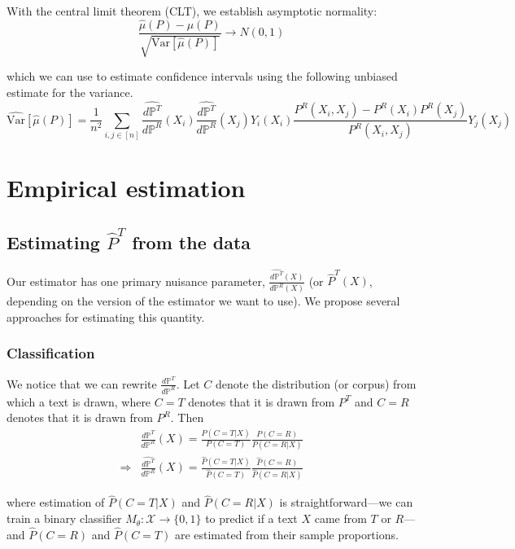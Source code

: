 \documentclass{article}
\begin{document}
With the central limit theorem (CLT), we establish asymptotic normality:
\begin{equation*}
    \frac{\hat{\mu}(P) - \mu(P)}{\sqrt{\text{Var}[\hat{\mu}(P)]}}\rightarrow N(0,1)
\end{equation*}

which we can use to estimate confidence intervals using the following unbiased estimate for the variance.
\begin{equation*}
    \widehat{\text{Var}}[\hat{\mu}(P)] = \frac{1}{n^2} \sum_{i,j \in [n]} \frac{\hat{d \mathbb{P}^T}}{d \mathbb{P}^R}(X_i)\frac{\hat{d \mathbb{P}^T}}{d \mathbb{P}^R}(X_j)Y_i(X_i)\frac{P^R(X_i,X_j) - P^R(X_i)P^R(X_j)}{P^R(X_i,X_j)}Y_j(X_j)
\end{equation*}

\section{Empirical estimation}
\subsection{Estimating $\hat{P}^T$ from the data}

Our estimator has one primary nuisance parameter, $\frac{\hat{d\mathbb{P}^T}(X)}{d\mathbb{P}^R(X)}$ (or $\hat{P}^T(X)$, depending on the version of the estimator we want to use). We propose several approaches for estimating this quantity.

\subsubsection{Classification}
\label{sec:classification}

We notice that we can rewrite $\frac{d\mathbb{P}^T}{d\mathbb{P}^R}$. Let $C$ denote the distribution (or corpus) from which a text is drawn, where $C=T$ denotes that it is drawn from $P^T$ and $C=R$ denotes that it is drawn from $P^R$. Then
\begin{equation*}
    \begin{split}
        &\frac{d\mathbb{P}^T}{d\mathbb{P}^R}(X) = \frac{P(C=T|X)}{P(C=T)}\frac{P(C=R)}{P(C=R|X)}\\
        \Rightarrow &\frac{\hat{d\mathbb{P}^T}}{d\mathbb{P}^R}(X) = \frac{\hat{P}(C=T|X)}{\hat{P}(C=T)}\frac{\hat{P}(C=R)}{\hat{P}(C=R|X)}
    \end{split}
\end{equation*}

where estimation of $\hat{P}(C=T|X)$ and $\hat{P}(C=R|X)$ is straightforward---we can train a binary classifier $M_\theta: \mathcal{X} \rightarrow \{0,1\}$ to predict if a text $X$ came from $T$ or $R$---and $\hat{P}(C=R)$ and $\hat{P}(C=T)$ are estimated from their sample proportions.
\end{document}
